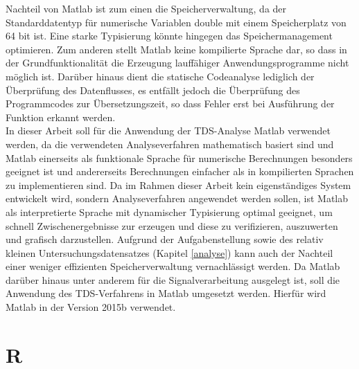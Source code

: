 Nachteil von Matlab ist zum einen die Speicherverwaltung, da der Standarddatentyp für numerische Variablen double mit einem Speicherplatz von 64 bit ist. Eine starke Typisierung könnte hingegen das Speichermanagement optimieren. Zum anderen stellt Matlab keine kompilierte Sprache dar, so dass in der Grundfunktionalität die Erzeugung lauffähiger Anwendungsprogramme nicht möglich ist. Darüber hinaus dient die statische Codeanalyse lediglich der Überprüfung des Datenflusses, es entfällt jedoch die Überprüfung des Programmcodes zur Übersetzungszeit, so dass Fehler erst bei Ausführung der Funktion erkannt werden.\\

In dieser Arbeit soll für die Anwendung der \acs{TDS}-Analyse Matlab verwendet werden, da die verwendeten Analyseverfahren mathematisch basiert sind und Matlab einerseits als funktionale Sprache für numerische Berechnungen besonders geeignet ist und andererseits Berechnungen einfacher als in kompilierten Sprachen zu implementieren sind. Da im Rahmen dieser Arbeit kein eigenständiges System entwickelt wird, sondern Analyseverfahren angewendet werden sollen, ist Matlab als interpretierte Sprache mit dynamischer Typisierung optimal geeignet, um schnell Zwischenergebnisse zur erzeugen und diese zu verifizieren, auszuwerten und grafisch darzustellen. Aufgrund der Aufgabenstellung sowie des relativ kleinen Untersuchungsdatensatzes (Kapitel \ref{analyse}) kann auch der Nachteil einer weniger effizienten Speicherverwaltung vernachlässigt werden. Da Matlab darüber hinaus unter anderem für die Signalverarbeitung ausgelegt ist, soll die Anwendung des \acs{TDS}-Verfahrens in Matlab umgesetzt werden. Hierfür wird  Matlab in der Version 2015b verwendet.

%


\section{R}

